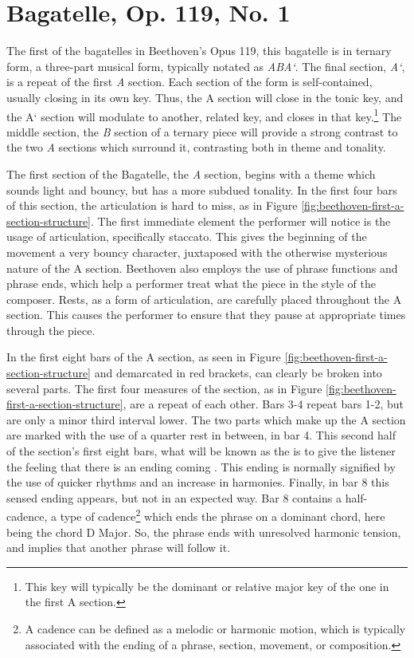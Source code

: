 \section{Bagatelle, Op. 119, No. 1}
The first of the bagatelles in Beethoven's Opus 119, this bagatelle is in ternary form, a three-part musical form, typically notated as \textit{ABA`}. The final section, \textit{A`}, is a repeat of the first \textit{A} section. Each section of the form is self-contained, usually closing in its own key\autocite{Tucker_Cochrane_2011}. Thus, the A section will close in the tonic key, and the A` section will modulate to another, related key, and closes in that key.\footnote{This key will typically be the dominant or relative major key of the one in the first A section.} The middle section, the \textit{B} section of a ternary piece will provide a strong contrast to the two \textit{A} sections which surround it, contrasting both in theme and tonality.

The first section of the Bagatelle, the \textit{A} section, begins with a theme which sounds light and bouncy, but has a more subdued tonality. In the first four bars of this section, the articulation is hard to miss, as in Figure \ref{fig:beethoven-first-a-section-structure}. The first immediate element the performer will notice is the usage of articulation, specifically staccato. This gives the beginning of the movement a very bouncy character, juxtaposed with the otherwise mysterious nature of the A section. Beethoven also employs the use of phrase functions and phrase ends, which help a performer treat what the piece  in the style of the composer. Rests, as a form of articulation, are carefully placed throughout the A section. This causes the performer to ensure that they pause at appropriate times through the piece. 

In the first eight bars of the A section, as seen in Figure \ref{fig:beethoven-first-a-section-structure}\autocite{Henle_1978} and demarcated in red brackets, can clearly be broken into several parts. The first four measures of the section, as in Figure \ref{fig:beethoven-first-a-section-structure}\autocite{Henle_1978}, are a repeat of each other. Bars 3-4 repeat bars 1-2, but are only a minor third interval lower. The two parts which make up the A section are marked with the use of a quarter rest in between, in bar 4. This second half of the section's first eight bars, what will be known as the  is to give the listener the feeling that there is an ending coming \autocite{Kerman_Tyson_Burnham_Johnson_Drabkin_2001}. This ending is normally signified by the use of quicker rhythms and an increase in harmonies. Finally, in bar 8 this sensed ending appears, but not in an expected way. Bar 8 contains a half-cadence, a type of cadence\footnote{A cadence can be defined as a melodic or harmonic motion, which is typically associated with the ending of a phrase, section, movement, or composition.}\autocite{Nagley_Whittall_2011} which ends the phrase on a dominant chord, here being the chord D Major. So, the phrase ends with unresolved harmonic tension, and implies that another phrase will follow it.

